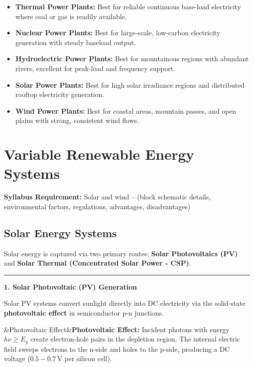 \documentclass[11pt,a4paper]{article}
\newcommand{\concept}[1]{%
  \vspace{3pt}\noindent\textcolor{AnthGreen}{\rule{3.5pt}{10pt}}\enspace
  \textbf{\sffamily\color{AnthDark}#1}\par\vspace{2pt}%
}
\newcommand{\syllabusitem}[1]{%
  \begin{tcolorbox}[enhanced, colback=AnthOrange!8, colframe=AnthOrange, boxrule=0.4pt, arc=3pt, left=7pt, right=7pt, top=3pt, bottom=3pt]
    \small\sffamily\textbf{\color{AnthOrange}Syllabus Requirement:} #1
  \end{tcolorbox}
}
\newenvironment{Note}[1][Note]{\begin{tcolorbox}[notebox, title=#1]}{\end{tcolorbox}}
\newenvironment{Def}[1][]{\begin{tcolorbox}[defbox]\ifx&#1&\else\textbf{\color{AnthOrange}#1:}\enspace\fi}{\end{tcolorbox}}
\begin{document}
\begin{Note}[Generation Selection Matrix]
\begin{itemize}
  \item \textbf{Thermal Power Plants:} Best for reliable continuous base-load electricity where coal or gas is readily available.
  \item \textbf{Nuclear Power Plants:} Best for large-scale, low-carbon electricity generation with steady baseload output.
  \item \textbf{Hydroelectric Power Plants:} Best for mountainous regions with abundant rivers, excellent for peak-load and frequency support.
  \item \textbf{Solar Power Plants:} Best for high solar irradiance regions and distributed rooftop electricity generation.
  \item \textbf{Wind Power Plants:} Best for coastal areas, mountain passes, and open plains with strong, consistent wind flows.
\end{itemize}
\end{Note}

\clearpage
\section{Variable Renewable Energy Systems}

\syllabusitem{Solar and wind -- (block schematic details, environmental factors, regulations, advantages, disadvantages)}

\subsection{Solar Energy Systems}

Solar energy is captured via two primary routes: \textbf{Solar Photovoltaics (PV)} and \textbf{Solar Thermal (Concentrated Solar Power - CSP)}.

\concept{1. Solar Photovoltaic (PV) Generation}
Solar PV systems convert sunlight directly into DC electricity via the solid-state \textbf{photovoltaic effect} in semiconductor p-n junctions.

\begin{Def}[Photovoltaic Effect]
Incident photons with energy $h\nu \ge E_g$ create electron-hole pairs in the depletion region. The internal electric field sweeps electrons to the n-side and holes to the p-side, producing a DC voltage ($0.5-0.7\,\text{V}$ per silicon cell).
\end{Def}
\end{document}

